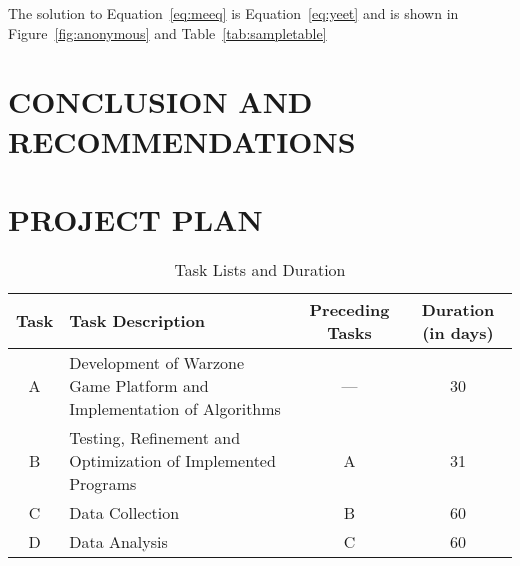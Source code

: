 \documentclass{strrespaper-trad}
\begin{document}
			The solution to Equation~\ref{eq:meeq} is Equation~\ref{eq:yeet} and is shown in Figure~\ref{fig:anonymous} and Table~\ref{tab:sampletable} \autocite{al-shemmeri_wind_2010}

	\section{CONCLUSION AND RECOMMENDATIONS}
		\lipsum[2-4]

	\literaturecited{}

    \appendix
    
    \section{PROJECT PLAN}
    \begin{table}[htbp]
        \centering
        \caption{Task Lists and Duration}
        \label{tab:task_lists_duration}
        \begin{tabularx}{\linewidth}{cXcc}
            \toprule
            Task & Task Description                                                      & Preceding Tasks & Duration (in days) \\
            \midrule
            A    & Development of Warzone Game Platform and Implementation of Algorithms & ---             & 30                 \\
            B    & Testing, Refinement and Optimization of Implemented Programs          & A               & 31                 \\
            C    & Data Collection                                                       & B               & 60                 \\
            D    & Data Analysis                                                         & C               & 60                 \\
            \bottomrule
        \end{tabularx}
    \end{table}
\end{document}
